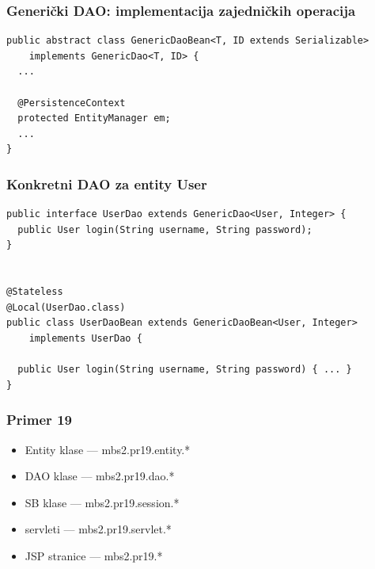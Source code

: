 \documentclass[compress]{beamer}
\begin{document}
\begin{frame}[fragile,shrink=10]
  \frametitle{Generički DAO: implementacija zajedničkih operacija}
\begin{verbatim}
public abstract class GenericDaoBean<T, ID extends Serializable> 
    implements GenericDao<T, ID> {
  ...
  
  @PersistenceContext
  protected EntityManager em;
  ...
}
\end{verbatim}
\end{frame}
\begin{frame}[fragile,shrink=10]
  \frametitle{Konkretni DAO za entity User}
\begin{verbatim}
public interface UserDao extends GenericDao<User, Integer> {
  public User login(String username, String password);
}


@Stateless
@Local(UserDao.class)
public class UserDaoBean extends GenericDaoBean<User, Integer> 
    implements UserDao {

  public User login(String username, String password) { ... }
}
\end{verbatim}
\end{frame}
\begin{frame}
  \frametitle{Primer 19}
  \begin{itemize}
    \item Entity klase --- mbs2.pr19.entity.*
    \item DAO klase --- mbs2.pr19.dao.*
    \item SB klase --- mbs2.pr19.session.*
    \item servleti --- mbs2.pr19.servlet.*
    \item JSP stranice --- mbs2.pr19.*
  \end{itemize}
\end{frame}
\end{document}

